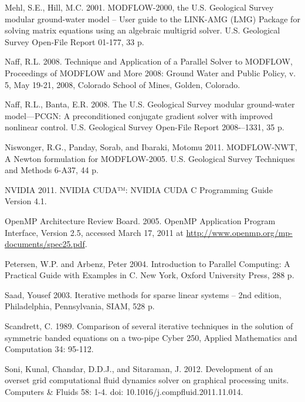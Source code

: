 \documentclass[12pt]{article}
\begin{document}
\begin{description}
\item Mehl, S.E., Hill, M.C. 2001. MODFLOW-2000, the U.S. Geological Survey modular ground-water model -- User guide to the LINK-AMG (LMG) Package for solving matrix equations using an algebraic multigrid solver. U.S. Geological Survey Open-File Report 01-177, 33 p.

\item Naff, R.L. 2008. Technique and Application of a Parallel Solver to MODFLOW, Proceedings of MODFLOW and More 2008: Ground Water and Public Policy, v. 5, May 19-21, 2008, Colorado School of Mines, Golden, Colorado.

\item Naff, R.L., Banta, E.R. 2008. The U.S. Geological Survey modular ground-water model—PCGN: A preconditioned conjugate gradient solver with improved nonlinear control. U.S. Geological Survey Open-File Report 2008-–1331, 35 p.

\item Niswonger, R.G., Panday, Sorab, and Ibaraki, Motomu 2011. MODFLOW-NWT, A Newton formulation for MODFLOW-2005. U.S. Geological Survey Techniques and Methods 6-A37, 44 p.

\item NVIDIA 2011. NVIDIA CUDA™: NVIDIA CUDA C Programming Guide Version 4.1.

\item OpenMP Architecture Review Board. 2005. OpenMP Application Program Interface, Version 2.5, accessed March 17, 2011 at \url{http://www.openmp.org/mp-documents/spec25.pdf}.

\item Petersen, W.P. and Arbenz, Peter 2004. Introduction to Parallel Computing: A Practical Guide with Examples in C. New York, Oxford University Press, 288 p.

\item Saad, Yousef 2003. Iterative methods for sparse linear systems – 2nd edition, Philadelphia, Pennsylvania, SIAM, 528 p.

\item Scandrett, C. 1989. Comparison of several iterative techniques in the solution of symmetric banded equations on a two-pipe Cyber 250, Applied Mathematics and Computation 34: 95-112.

\item Soni, Kunal, Chandar, D.D.J., and Sitaraman, J. 2012. Development of an overset grid computational fluid dynamics solver on graphical processing units. Computers \& Fluids 58: 1-4. doi: 10.1016/j.compfluid.2011.11.014.


\end{description}
\end{document}
